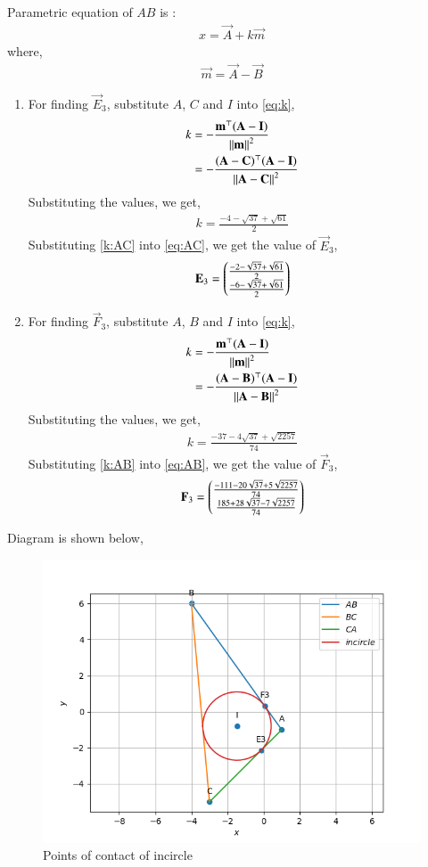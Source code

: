 \documentclass[journal,12pt,twocolumn]{IEEEtran}
\theoremstyle{remark}
\begin{document}
Parametric equation of $AB$ is : 
\begin{align}
	x = \vec{A} + k\vec{m} \label{eq:AB}
\end{align}
where,
\begin{align}
	\vec{m} = \vec{A} - \vec{B}
\end{align}
\begin{enumerate}
	\item For finding $\vec{E}_3$, substitute $A$, $C$ and $I$ into \eqref{eq:k},
		\begin{align}
			k &= -\frac{\mathbf{m}^{\top}(\mathbf{A} - \mathbf{I})}{\left\lVert\mathbf{m}\right\rVert^2} \\
			&= -\frac{(\mathbf{A}-\mathbf{C})^{\top}(\mathbf{A} - \mathbf{I})}{\left\lVert\mathbf{A}-\mathbf{C}\right\rVert^2}
		\end{align}
		Substituting the values, we get,
		\begin{align}
			k = \frac{-4-\sqrt{37}+\sqrt{61}}{2} \label{k:AC} 
		\end{align}
		Substituting \eqref{k:AC} into \eqref{eq:AC}, we get the value of $\vec{E}_3$,
		\begin{align}
			\mathbf{E}_3 = \begin{pmatrix}
				\frac{-2-\sqrt{37}+\sqrt{61}}{2}\\ 
				\frac{-6-\sqrt{37}+\sqrt{61}}{2}
			\end{pmatrix}
		\end{align}
	\item For finding $\vec{F}_3$, substitute $A$, $B$ and $I$ into \eqref{eq:k},
		\begin{align}
			k &= -\frac{\mathbf{m}^{\top}(\mathbf{A} - \mathbf{I})}{\left\lVert\mathbf{m}\right\rVert^2} \\
			&= -\frac{(\mathbf{A}-\mathbf{B})^{\top}(\mathbf{A} - \mathbf{I})}{\left\lVert\mathbf{A}-\mathbf{B}\right\rVert^2}
		\end{align}
		Substituting the values, we get,
		\begin{align}
			k = \frac{-37-4\sqrt{37}+\sqrt{2257}}{74} \label{k:AB}
		\end{align}
		Substituting \eqref{k:AB} into \eqref{eq:AB}, we get the value of $\vec{F}_3$,
		\begin{align}
			\mathbf{F}_3 = \begin{pmatrix}
				\frac{-111-20\sqrt{37}+5\sqrt{2257}}{74}\\ 
				\frac{185+28\sqrt{37}-7\sqrt{2257}}{74}
			\end{pmatrix}
		\end{align}
\end{enumerate}
Diagram is shown below,
\begin{figure}[h]
	\centering
	\includegraphics[width=\columnwidth]{./figs/Diagram.png}
	\caption{Points of contact of incircle}
	\label{Incircle}
\end{figure}
\end{document}
